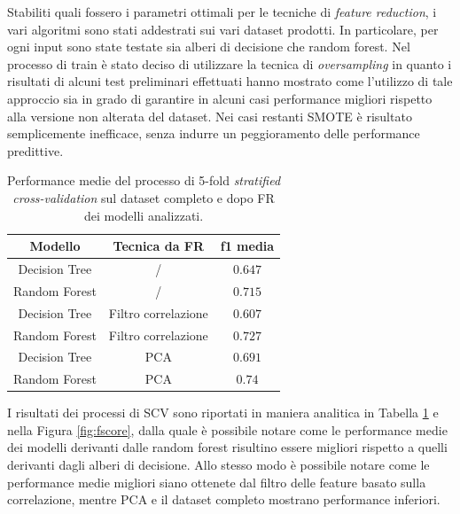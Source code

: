 Stabiliti quali fossero i parametri ottimali per le tecniche di \textit{feature reduction}, i vari algoritmi sono stati addestrati sui vari dataset prodotti. In particolare, per ogni input sono state testate sia alberi di decisione che random forest. Nel processo di train è stato deciso di utilizzare la tecnica di \textit{oversampling} in quanto i risultati di alcuni test preliminari effettuati hanno mostrato come l'utilizzo di tale approccio sia in grado di garantire in alcuni casi performance migliori rispetto alla versione non alterata del dataset. 
Nei casi restanti SMOTE è risultato semplicemente inefficace, senza indurre un peggioramento delle performance predittive.
\begin{table}
	\centering
	\caption{Performance medie del processo di 5-fold \textit{stratified cross-validation} sul dataset completo e dopo FR dei modelli analizzati.}
	\label{tab:f1score}
	\begin{tabular}{|c|c|c|}
		\toprule
		Modello & Tecnica da FR & f1 media \\ 
		\midrule 
		Decision Tree & / & $0.647$ \\
		Random Forest & / & $0.715$ \\ 
		Decision Tree & Filtro correlazione & $0.607$ \\ 
		Random Forest & Filtro correlazione & $0.727$ \\ 
		Decision Tree & PCA & $0.691$ \\ 
		Random Forest & PCA & $0.74$ \\ 
		\bottomrule
	\end{tabular}
\end{table}
I risultati dei processi di SCV sono riportati in maniera analitica in Tabella \ref{tab:f1score} e nella Figura \ref{fig:fscore}, dalla quale è possibile notare come le performance medie dei modelli derivanti dalle random forest risultino essere migliori rispetto a quelli derivanti dagli alberi di decisione. Allo stesso modo è possibile notare come le performance medie migliori siano ottenete dal filtro delle feature basato sulla correlazione, mentre PCA e il dataset completo mostrano performance inferiori. 
